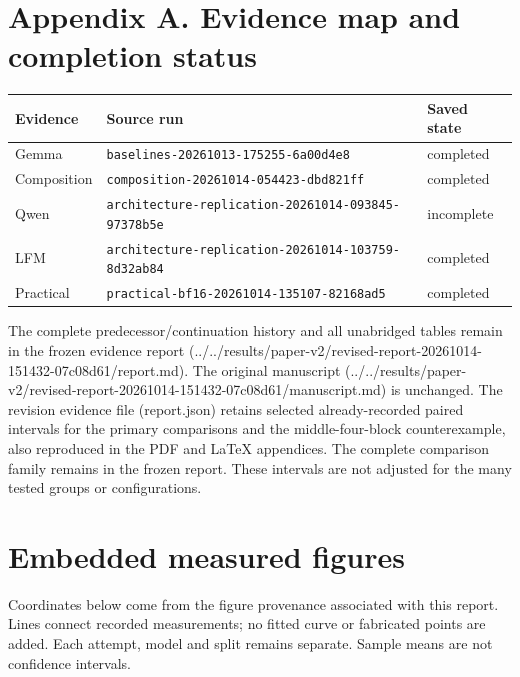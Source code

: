 \documentclass[10pt]{article}
\begin{document}
\section{Appendix A. Evidence map and completion status}

{\scriptsize\setlength{\tabcolsep}{2pt}
\begin{longtable}{p{}p{}p{}}
Evidence & Source run & Saved state \\
\hline\endhead
Gemma & \texttt{baselines-20261013-175255-6a00d4e8} & completed \\
Composition & \texttt{composition-20261014-054423-dbd821ff} & completed \\
Qwen & \texttt{architecture-replication-20261014-093845-97378b5e} & incomplete \\
LFM & \texttt{architecture-replication-20261014-103759-8d32ab84} & completed \\
Practical & \texttt{practical-bf16-20261014-135107-82168ad5} & completed \\
\end{longtable}}

The complete predecessor/continuation history and all unabridged tables remain in the frozen evidence report (../../results/paper-v2/revised-report-20261014-151432-07c08d61/report.md). The original manuscript (../../results/paper-v2/revised-report-20261014-151432-07c08d61/manuscript.md) is unchanged. The revision evidence file (report.json) retains selected already-recorded paired intervals for the primary comparisons and the middle-four-block counterexample, also reproduced in the PDF and LaTeX appendices. The complete comparison family remains in the frozen report. These intervals are not adjusted for the many tested groups or configurations.
\section{Embedded measured figures}
Coordinates below come from the figure provenance associated with this report. Lines connect recorded measurements; no fitted curve or fabricated points are added. Each attempt, model and split remains separate. Sample means are not confidence intervals.
\end{document}
